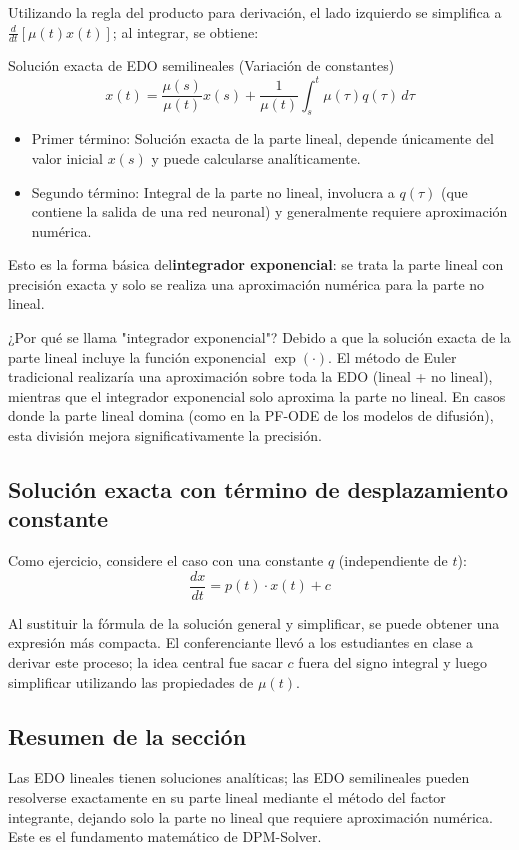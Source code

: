 Utilizando la regla del producto para derivación, el lado izquierdo se simplifica a $\frac{d}{dt}\left[\mu(t) x(t)\right]$; al integrar, se obtiene:

\begin{importantbox}{Solución exacta de EDO semilineales (Variación de constantes)}
$$x(t) = \frac{\mu(s)}{\mu(t)} x(s) + \frac{1}{\mu(t)} \int_s^t \mu(\tau) q(\tau)\, d\tau$$
\begin{itemize}
    \item Primer término: Solución exacta de la parte lineal, depende únicamente del valor inicial $x(s)$ y puede calcularse analíticamente.
    \item Segundo término: Integral de la parte no lineal, involucra a $q(\tau)$ (que contiene la salida de una red neuronal) y generalmente requiere aproximación numérica.
\end{itemize}
Esto es la forma básica del\textbf{integrador exponencial}: se trata la parte lineal con precisión exacta y solo se realiza una aproximación numérica para la parte no lineal.
\end{importantbox}

\begin{knowledgebox}{¿Por qué se llama "integrador exponencial"?}
Debido a que la solución exacta de la parte lineal incluye la función exponencial $\exp(\cdot)$. El método de Euler tradicional realizaría una aproximación sobre toda la EDO (lineal + no lineal), mientras que el integrador exponencial solo aproxima la parte no lineal. En casos donde la parte lineal domina (como en la PF-ODE de los modelos de difusión), esta división mejora significativamente la precisión.
\end{knowledgebox}

\subsection{Solución exacta con término de desplazamiento constante}

Como ejercicio, considere el caso con una constante $q$ (independiente de $t$):
$$\frac{dx}{dt} = p(t) \cdot x(t) + c$$

Al sustituir la fórmula de la solución general y simplificar, se puede obtener una expresión más compacta. El conferenciante llevó a los estudiantes en clase a derivar este proceso; la idea central fue sacar $c$ fuera del signo integral y luego simplificar utilizando las propiedades de $\mu(t)$.

\subsection{Resumen de la sección}

Las EDO lineales tienen soluciones analíticas; las EDO semilineales pueden resolverse exactamente en su parte lineal mediante el método del factor integrante, dejando solo la parte no lineal que requiere aproximación numérica. Este es el fundamento matemático de DPM-Solver.
